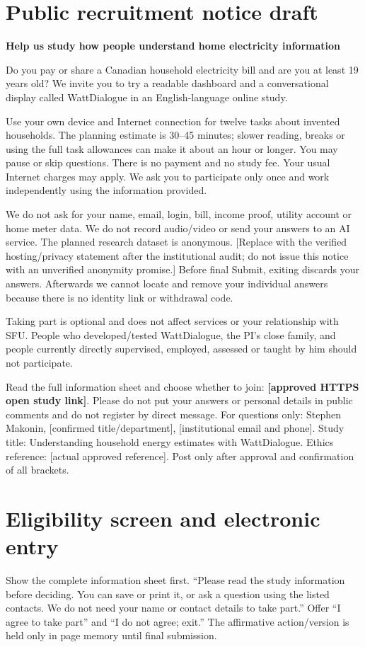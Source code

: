 \documentclass[11pt,letterpaper]{article}
\begin{document}
\newpage
\section{Public recruitment notice draft}\label{app:recruit}
\textbf{Help us study how people understand home electricity information}

Do you pay or share a Canadian household electricity bill and are you at least 19 years old? We invite you to try a readable dashboard and a conversational display called WattDialogue in an English-language online study.

Use your own device and Internet connection for twelve tasks about invented households. The planning estimate is 30--45 minutes; slower reading, breaks or using the full task allowances can make it about an hour or longer. You may pause or skip questions. There is no payment and no study fee. Your usual Internet charges may apply. We ask you to participate only once and work independently using the information provided.

We do not ask for your name, email, login, bill, income proof, utility account or home meter data. We do not record audio/video or send your answers to an AI service. The planned research dataset is anonymous. [Replace with the verified hosting/privacy statement after the institutional audit; do not issue this notice with an unverified anonymity promise.] Before final Submit, exiting discards your answers. Afterwards we cannot locate and remove your individual answers because there is no identity link or withdrawal code.

Taking part is optional and does not affect services or your relationship with SFU. People who developed/tested WattDialogue, the PI's close family, and people currently directly supervised, employed, assessed or taught by him should not participate.

Read the full information sheet and choose whether to join: \textbf{[approved HTTPS open study link]}. Please do not put your answers or personal details in public comments and do not register by direct message. For questions only: Stephen Makonin, [confirmed title/department], [institutional email and phone]. Study title: Understanding household energy estimates with WattDialogue. Ethics reference: [actual approved reference]. Post only after approval and confirmation of all brackets.

\newpage
\section{Eligibility screen and electronic entry}\label{app:screen}
Show the complete information sheet first. ``Please read the study information before deciding. You can save or print it, or ask a question using the listed contacts. We do not need your name or contact details to take part.'' Offer ``I agree to take part'' and ``I do not agree; exit.'' The affirmative action/version is held only in page memory until final submission.
\end{document}
